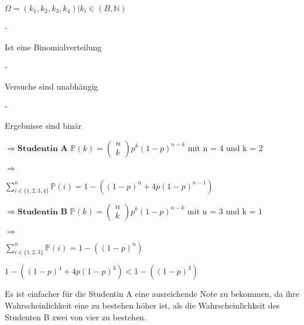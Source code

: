 \documentclass[10pt,a4paper,parskip=half]{scrartcl}
\begin{document}
\begin{center}
$\Omega = (k_1, k_2, k_3, k_4) | k_i \in (B, \mathbb{N}) $
\item
\item[-]
\begin{description}
Ist eine Binomialverteilung
\end{description}
\item[-]
\begin{description}
Versuche sind unabhängig
\end{description}
\item[-]
\begin{description}
Ergebnisse sind binär
\end{description}
\begin{center} 
$\Rightarrow \textbf{Studentin A } \boxed{\mathbb{P} (k) = \left( \begin{array}{cc} n \\ k \end{array} \right) p^k (1- p)^{n-k}} \text{ mit n = 4 und k = 2}$
\end{center}
\item[$\Rightarrow$]
\begin{description}
$\sum\limits_{i \in {\{1,2,3,4\}}}^n \mathbb{P} (i) = 1 - \left( (1-p)^n + 4p(1-p)^{n-1} \right)$
\end{description}
\begin{center} 
$\Rightarrow \textbf{Studentin B } \boxed{\mathbb{P} (k) = \left( \begin{array}{cc} n \\ k \end{array} \right) p^k (1- p)^{n-k}} \text{ mit n = 3 und k = 1}$
\end{center}
\item[$\Rightarrow$]
\begin{description}
$\sum\limits_{i \in {\{1,2,3\}}}^n \mathbb{P} (i) = 1 - \left( (1-p)^n \right)$
\end{description}
\begin{center}
$1 - \left( (1-p)^4 + 4p(1-p)^{3} \right) < 1 - \left( (1-p)^3 \right) $\\[1cm]
\end{center}
Es ist einfacher für die Studentin A eine ausreichende Note zu bekommen, da ihre Wahrscheinlichkeit eine zu bestehen höher ist, als die Wahrscheinlichkeit des Studenten B zwei von vier zu bestehen.
\end{center}
\end{document}

